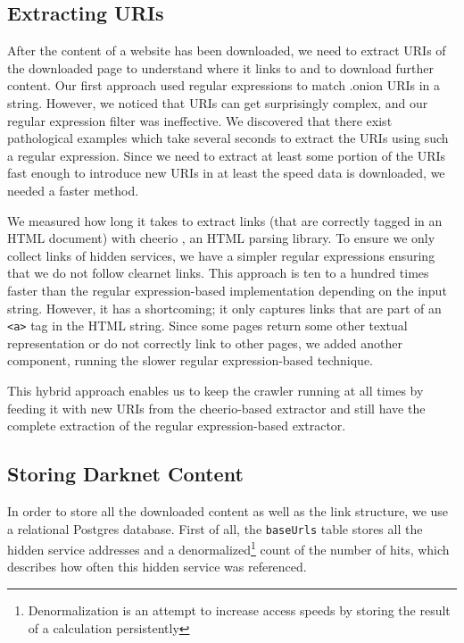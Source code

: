 \subsection{Extracting URIs}

After the content of a website has been downloaded, we need to extract URIs of the downloaded page to understand where it links to and to download further content. Our first approach used regular expressions to match .onion URIs in a string. However, we noticed that URIs can get surprisingly complex, and our regular expression filter was ineffective. We discovered that there exist pathological examples which take several seconds to extract the URIs using such a regular expression. Since we need to extract at least some portion of the URIs fast enough to introduce new URIs in at least the speed data is downloaded, we needed a faster method.

We measured how long it takes to extract links (that are correctly tagged in an HTML document) with cheerio \cite{cheeriojs}, an HTML parsing library. To ensure we only collect links of hidden services, we have a simpler regular expressions ensuring that we do not follow clearnet links. This approach is ten to a hundred times faster than the regular expression-based implementation depending on the input string. However, it has a shortcoming; it only captures links that are part of an \texttt{<a>} tag in the HTML string. Since some pages return some other textual representation or do not correctly link to other pages, we added another component, running the slower regular expression-based technique.

This hybrid approach enables us to keep the crawler running at all times by feeding it with new URIs from the cheerio-based extractor and still have the complete extraction of the regular expression-based extractor.
%
%
\subsection{Storing Darknet Content}
In order to store all the downloaded content as well as the link structure, we use a relational Postgres database. First of all, the \texttt{baseUrls} table stores all the hidden service addresses and a denormalized\footnote{Denormalization is an attempt to increase access speeds by storing the result of a calculation persistently} count of the number of hits, which describes how often this hidden service was referenced.


